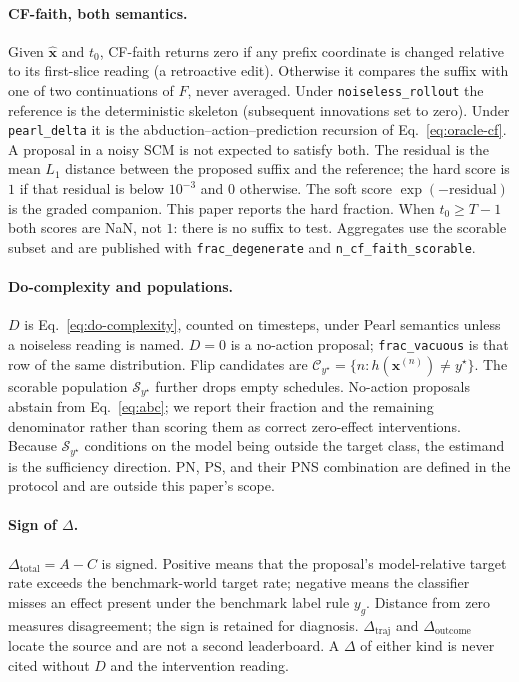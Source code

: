 \documentclass{article}
\newcommand{\bx}{\mathbf{x}}
\newcommand{\dototal}{\Delta_{\mathrm{total}}}
\newcommand{\dotraj}{\Delta_{\mathrm{traj}}}
\newcommand{\dooutcome}{\Delta_{\mathrm{outcome}}}
\begin{document}
\paragraph{CF-faith, both semantics.}
Given $\hat{\bx}$ and $t_0$, CF-faith returns zero if any prefix coordinate is changed relative to its first-slice reading (a retroactive edit). Otherwise it compares the suffix with one of two continuations of $F$, never averaged. Under \texttt{noiseless\_rollout} the reference is the deterministic skeleton (subsequent innovations set to zero). Under \texttt{pearl\_delta} it is the abduction--action--prediction recursion of Eq.~\eqref{eq:oracle-cf}. A proposal in a noisy SCM is not expected to satisfy both. The residual is the mean $L_1$ distance between the proposed suffix and the reference; the hard score is $1$ if that residual is below $10^{-3}$ and $0$ otherwise. The soft score $\exp(-\mathrm{residual})$ is the graded companion. This paper reports the hard fraction. When $t_0\ge T-1$ both scores are NaN, not $1$: there is no suffix to test. Aggregates use the scorable subset and are published with \texttt{frac\_degenerate} and \texttt{n\_cf\_faith\_scorable}.

\paragraph{Do-complexity and populations.}
$D$ is Eq.~\eqref{eq:do-complexity}, counted on timesteps, under Pearl semantics unless a noiseless reading is named.  $D=0$ is a no-action proposal; \texttt{frac\_vacuous} is that row of the same distribution.  Flip candidates are $\mathcal{C}_{y^\star}=\{n:h(\bx^{(n)})\neq y^\star\}$.  The scorable population $\mathcal{S}_{y^\star}$ further drops empty schedules.  No-action proposals abstain from Eq.~\eqref{eq:abc}; we report their fraction and the remaining denominator rather than scoring them as correct zero-effect interventions.  Because $\mathcal{S}_{y^\star}$ conditions on the model being outside the target class, the estimand is the sufficiency direction.  PN, PS, and their PNS combination are defined in the protocol and are outside this paper's scope.

\paragraph{Sign of $\Delta$.}
$\dototal=A-C$ is signed. Positive means that the proposal's model-relative target rate exceeds the benchmark-world target rate; negative means the classifier misses an effect present under the benchmark label rule $y_g$. Distance from zero measures disagreement; the sign is retained for diagnosis. $\dotraj$ and $\dooutcome$ locate the source and are not a second leaderboard. A $\Delta$ of either kind is never cited without $D$ and the intervention reading.
\end{document}
